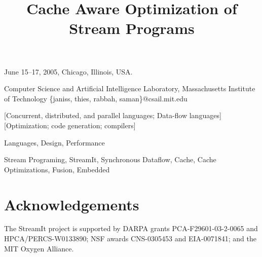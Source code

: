 \documentclass[preprint]{sigplanconf}
\begin{document}
 {June 15--17, 2005, Chicago, Illinois, USA.}

\title{Cache Aware Optimization of Stream Programs}
	     {Computer Science and Artificial Intelligence Laboratory, Massachusetts Institute of Technology}
	     {\{janiss, thies, rabbah, saman\}@csail.mit.edu}

\maketitle

\begin{abstract}

\end{abstract}

[Concurrent, distributed, and parallel languages; Data-flow languages]
[Optimization; code generation; compilers]

\terms 
Languages, Design, Performance

\keywords
Stream Programing, StreamIt, Synchronous Dataflow, Cache, Cache
Optimizations, Fusion, Embedded










\section{Acknowledgements}
The StreamIt project is
supported by DARPA grants PCA-F29601-03-2-0065 and
HPCA/PERCS-W0133890; NSF awards CNS-0305453 and EIA-0071841; and the
MIT Oxygen Alliance.




\clearpage
\end{document}
